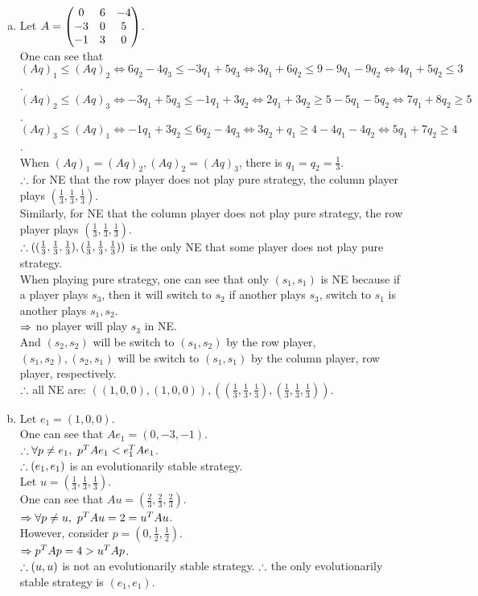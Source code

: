 \begin{pr}$ $
\begin{enumerate}[(a)]
\item Let $A=\begin{pmatrix}
0&6&-4\\
-3&0&5\\
-1&3&0
\end{pmatrix}$.\\
One can see that $(Aq)_1\leq(Aq)_2\iff6q_2-4q_3\leq-3q_1+5q_3\iff3q_1+6q_2\leq9-9q_1-9q_2\iff4q_1+5q_2\leq3$.\\
$(Aq)_2\leq(Aq)_3\iff-3q_1+5q_3\leq-1q_1+3q_2\iff2q_1+3q_2\geq5-5q_1-5q_2\iff7q_1+8q_2\geq5$.\\
$(Aq)_3\leq(Aq)_1\iff-1q_1+3q_2\leq6q_2-4q_3\iff3q_2+q_1\geq4-4q_1-4q_2\iff5q_1+7q_2\geq4$.\\
When $(Aq)_1=(Aq)_2, (Aq)_2=(Aq)_3$, there is $q_1=q_2=\frac13$.\\
$\therefore$ for NE that the row player does not play pure strategy, the column player plays $(\frac13, \frac13, \frac13)$.\\
Similarly, for NE that the column player does not play pure strategy, the row player plays $(\frac13, \frac13, \frac13)$.\\
$\therefore((\frac13, \frac13, \frac13), (\frac13, \frac13, \frac13))$ is the only NE that some player does not play pure strategy.\\
When playing pure strategy, one can see that only $(s_1, s_1)$ is NE because if a player plays $s_3$, then it will switch to $s_2$ if another plays $s_3$, switch to $s_1$ is another plays $s_1, s_2$.\\
$\Rightarrow$ no player will play $s_3$ in NE.\\
And $(s_2, s_2)$ will be switch to $(s_1, s_2)$ by the row player, $(s_1, s_2), (s_2, s_1)$ will be switch to $(s_1, s_1)$ by the column player, row player, respectively.\\
$\therefore$ all NE are: $((1, 0, 0), (1, 0, 0)), ((\frac13, \frac13, \frac13), (\frac13, \frac13, \frac13))$.
\item Let $e_1=(1, 0, 0)$.\\
One can see that $Ae_1=(0, -3, -1)$.\\
$\so\forall p\neq e_1,\ p^TAe_1<e_1^TAe_1$.\\
$\therefore(e_1, e_1)$ is an evolutionarily stable strategy.\\
Let $u=(\frac13, \frac13, \frac13)$.\\
One can see that $Au=(\frac23, \frac23, \frac23)$.\\
$\then\forall p\neq u,\ p^TAu=2=u^TAu$.\\
However, consider $p=(0, \frac12, \frac12)$.\\
$\Rightarrow p^TAp=4>u^TAp$.\\
$\therefore(u, u)$ is not an evolutionarily stable strategy.
$\therefore$ the only evolutionarily stable strategy is $(e_1, e_1)$.
\end{enumerate}
\end{pr}
